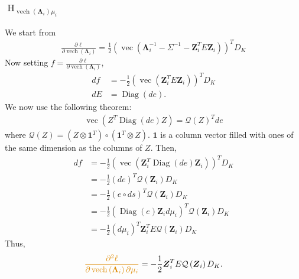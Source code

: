 \documentclass[11pt]{article}
\newcommand{\bs}{\boldsymbol}
\newcommand{\opn}{\operatorname}
\begin{document}
\subsubsection{$\opn{H}_{\opn{vech}\left(\bs{\Lambda}_{i}\right)\mu_{i}} $}
We start from
\begin{align*}
  \frac{\partial \ell}{\partial \opn{vech}\left(\bs{\Lambda}_{i} \right)} = \frac{1}{2}\left(\opn{vec}\left(\bs{\Lambda}_{i}^{-1} - \Sigma^{-1} - \bs{Z}_{i}^{T}E\bs{Z}_{i} \right) \right)^{T}D_{K}
\end{align*}
Now setting $f =  \frac{\partial \ell}{\partial \opn{vech}\left(\bs{\Lambda}_{i} \right)}$,
\begin{align*}
  df &= -\frac{1}{2} \left(\opn{vec}\left(\bs{Z}_{i}^{T}E \bs{Z}_{i} \right) \right)^{T}D_{K}\\
  dE &= \opn{Diag} \left(de \right).
\end{align*}
We now use the following theorem:
\begin{align*}
  \opn{vec}\left(Z^{T}\opn{Diag}\left(de \right)Z \right) = \mathcal{Q}\left(Z\right)^{T}de
\end{align*}
where $\mathcal{Q}\left(Z\right) = \left(Z \otimes \bs{1}^{T}\right) \circ \left(\bs{1}^{T}\otimes Z\right)$. $\bs{1}$ is a column vector filled with ones of the same dimension as the columns of $Z$.
Then,
\begin{align*}
  df &= -\frac{1}{2}\left(\opn{vec}\left(\bs{Z}_{i}^{T}\opn{Diag}\left(de \right)\bs{Z}_{i} \right) \right)^{T}D_{K}\\
  &= -\frac{1}{2}\left(de \right)^{T}\mathcal{Q}\left(\bs{Z}_{i}\right)D_{K}\\
  &= -\frac{1}{2}\left(e \circ ds \right)^{T}\mathcal{Q}\left(\bs{Z}_{i}\right)D_{K}\\
  &= -\frac{1}{2}\left(\opn{Diag}\left(e\right)\bs{Z}_{i}d\mu_{i} \right)^{T}\mathcal{Q}\left(\bs{Z}_{i}\right)D_{K}\\
  &= -\frac{1}{2}\left(d\mu_{i} \right)^{T}\bs{Z}_{i}^{T}E\mathcal{Q}\left(\bs{Z}_{i}\right)D_{K}
\end{align*}
Thus,
\begin{align*}
  \textcolor{myorange}{\frac{\partial^{2}\ell}{\partial \opn{vech}\left(\bs{\Lambda}_{i}\right)\partial \mu_{i}}} = -\frac{1}{2}\bs{Z}_{i}^{T}E\mathcal{Q}\left(\bs{Z}_{i}\right)D_{K}.
\end{align*}
\end{document}
